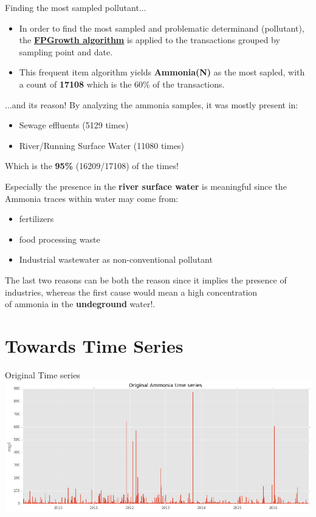 \documentclass[british]{beamer}
\begin{document}
\begin{frame}{Finding the most sampled pollutant...}
	\begin{itemize}
		\item In order to find the most sampled and problematic determinand (pollutant), the \href{https://en.wikibooks.org/wiki/Data_Mining_Algorithms_In_R/Frequent_Pattern_Mining/The_FP-Growth_Algorithm}{\textbf{FPGrowth algorithm}} is applied to the transactions grouped by sampling point and date.
		
		\item This frequent item algorithm yields \textbf{Ammonia(N)} as the most sapled, with a count of \textbf{17108} which is the 60\% of the transactions.
	\end{itemize}
\end{frame}

\begin{frame}{...and its reason!}
	By analyzing the ammonia samples, it was mostly present in:
	\begin{itemize}
		\item Sewage effluents (5129 times)
		\item River/Running Surface Water (11080 times)	
	\end{itemize}
	Which is the \textbf{95\%} (16209/17108) of the times!
	
	Especially the presence in the \textbf{river surface water} is meaningful since the Ammonia traces within water may come from:
	\begin{itemize}
		\item fertilizers
		\item food processing waste
		\item Industrial wastewater as non-conventional pollutant
	\end{itemize}
	
	The last two reasons can be both the reason since it implies the presence of industries, whereas the first cause would mean a high concentration  \\ of ammonia in the \textbf{undeground} water!.
\end{frame}
	
\section{Towards Time Series}

\begin{frame}{Original Time series}
	\includegraphics[width=1\textwidth]{./Imgs/original_ts.png}
\end{frame}
\end{document}
